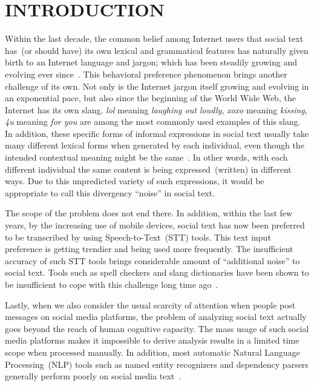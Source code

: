 \documentclass[a4paper,onesided,12pt]{report}
\begin{document}
\chapter{INTRODUCTION}
\label{chapter:introduction}
Within the last decade, the common belief among Internet users that social text has~(or should have) its own lexical and grammatical features has naturally given birth to an Internet language and jargon; which has been steadily growing and evolving ever since~\cite{Choudhury:2007:IMS:1326044.1326048, eisenstein2013bad}. This behavioral preference phenomenon brings another challenge of its own. Not only is the Internet jargon itself growing and evolving in an exponential pace, but also since the beginning of the World Wide Web, the Internet has its own slang. \textit{lol} meaning \textit{laughing out loudly},  \textit{xoxo} meaning \textit{kissing}, \textit{4u} meaning \textit{for you} are among the most commonly used examples of this slang. In addition, these specific forms of informal expressions in social text usually take many different lexical forms when generated by each individual, even though the intended contextual meaning might be the same~\cite{eisenstein2013bad}. In other words, with each different individual the same content is being expressed~(written) in different ways. Due to this unpredicted variety of such expressions, it would be appropriate to call this divergency ``noise'' in social text.

The scope of the problem does not end there. In addition, within the last few years, by the increasing use of mobile devices, social text has now been preferred to be transcribed by using Speech-to-Text~(STT) tools. This text input preference is getting trendier and being used more frequently. The insufficient accuracy of such STT tools brings considerable amount of ``additional noise'' to social text. Tools such as spell checkers and slang dictionaries have been shown to be insufficient to cope with this challenge long time ago~\cite{sproat2001normalization}.

Lastly, when we also consider the usual scarcity of attention when people post messages on social media platforms, the problem of analyzing social text actually goes beyond the reach of human cognitive capacity. The mass usage of such social media platforms makes it impossible to derive analysis results in a limited time scope when processed manually. In addition, most automatic Natural Language Processing~(NLP) tools such as named entity recognizers and  dependency parsers generally perform poorly on social media text~\cite{ritter2010unsupervised}.
\end{document}
